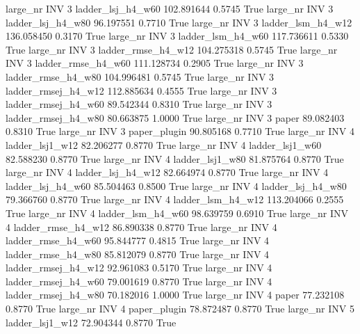   large_nr      INV                 3   ladder_lsj_h4_w60  102.891644      0.5745    True
  large_nr      INV                 3   ladder_lsj_h4_w80   96.197551      0.7710    True
  large_nr      INV                 3   ladder_lsm_h4_w12  136.058450      0.3170    True
  large_nr      INV                 3   ladder_lsm_h4_w60  117.736611      0.5330    True
  large_nr      INV                 3  ladder_rmse_h4_w12  104.275318      0.5745    True
  large_nr      INV                 3  ladder_rmse_h4_w60  111.128734      0.2905    True
  large_nr      INV                 3  ladder_rmse_h4_w80  104.996481      0.5745    True
  large_nr      INV                 3 ladder_rmsej_h4_w12  112.885634      0.4555    True
  large_nr      INV                 3 ladder_rmsej_h4_w60   89.542344      0.8310    True
  large_nr      INV                 3 ladder_rmsej_h4_w80   80.663875      1.0000    True
  large_nr      INV                 3               paper   89.082403      0.8310    True
  large_nr      INV                 3        paper_plugin   90.805168      0.7710    True
  large_nr      INV                 4     ladder_lsj1_w12   82.206277      0.8770    True
  large_nr      INV                 4     ladder_lsj1_w60   82.588230      0.8770    True
  large_nr      INV                 4     ladder_lsj1_w80   81.875764      0.8770    True
  large_nr      INV                 4   ladder_lsj_h4_w12   82.664974      0.8770    True
  large_nr      INV                 4   ladder_lsj_h4_w60   85.504463      0.8500    True
  large_nr      INV                 4   ladder_lsj_h4_w80   79.366760      0.8770    True
  large_nr      INV                 4   ladder_lsm_h4_w12  113.204066      0.2555    True
  large_nr      INV                 4   ladder_lsm_h4_w60   98.639759      0.6910    True
  large_nr      INV                 4  ladder_rmse_h4_w12   86.890338      0.8770    True
  large_nr      INV                 4  ladder_rmse_h4_w60   95.844777      0.4815    True
  large_nr      INV                 4  ladder_rmse_h4_w80   85.812079      0.8770    True
  large_nr      INV                 4 ladder_rmsej_h4_w12   92.961083      0.5170    True
  large_nr      INV                 4 ladder_rmsej_h4_w60   79.001619      0.8770    True
  large_nr      INV                 4 ladder_rmsej_h4_w80   70.182016      1.0000    True
  large_nr      INV                 4               paper   77.232108      0.8770    True
  large_nr      INV                 4        paper_plugin   78.872487      0.8770    True
  large_nr      INV                 5     ladder_lsj1_w12   72.904344      0.8770    True
